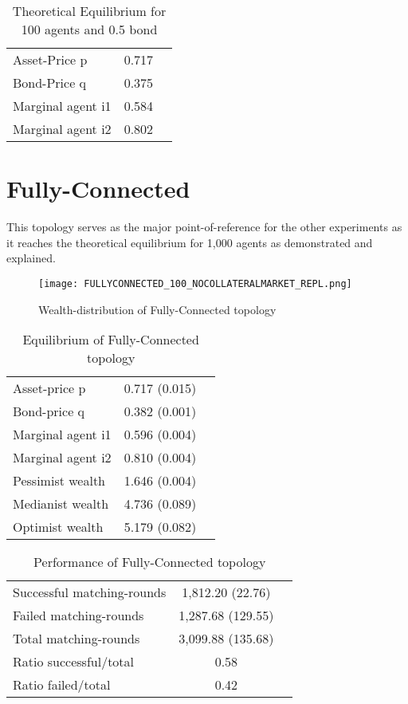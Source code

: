 \documentclass[Bachelorarbeit.tex]{subfiles}
\begin{document}
\begin{table}[H]
	\centering
	\caption{Theoretical Equilibrium for 100 agents and 0.5 bond}
	\begin{tabular} { l c r }
		\hline
		Asset-Price p & 0.717 \\
		Bond-Price q & 0.375 \\
		Marginal agent i1 & 0.584 \\
		Marginal agent i2 & 0.802 \\
		\hline
	\end{tabular}
	\label{tab:theoretical_equilibrium_100Agents_05Bond}
\end{table}

\section{Fully-Connected}
This topology serves as the major point-of-reference for the other experiments as it reaches the theoretical equilibrium for 1,000 agents as demonstrated and explained.

\begin{figure}[H]
	\centering
  \texttt{[image: FULLYCONNECTED\_100\_NOCOLLATERALMARKET\_REPL.png]}
	\caption{Wealth-distribution of Fully-Connected topology}
	\label{fig:wealth_FULLYCONNECTED_100_NOCOLLATERALMARKET_REPL}
\end{figure}

\begin{table}[H]
	\caption{Equilibrium of Fully-Connected topology}
	\centering
	\begin{tabular} { l c r }
		\hline
		Asset-price p & 0.717 (0.015) \\
		Bond-price q & 0.382 (0.001) \\
		Marginal agent i1 & 0.596 (0.004) \\
		Marginal agent i2 & 0.810 (0.004) \\
		\hline
		Pessimist wealth & 1.646 (0.004) \\
		Medianist wealth & 4.736 (0.089) \\
		Optimist wealth & 5.179 (0.082) \\
		\hline
	\end{tabular}
	\label{tab:fullyconnected_equilibrium_100Agents_05Bond}
\end{table} 

\begin{table}[H]
	\caption{Performance of Fully-Connected topology}
	\centering
	\begin{tabular} { l c r }
		\hline
		Successful matching-rounds & 1,812.20 (22.76) \\
		Failed matching-rounds & 1,287.68 (129.55) \\
		Total matching-rounds & 3,099.88 (135.68) \\
		\hline
		Ratio successful/total & 0.58 \\
		Ratio failed/total & 0.42 \\
		\hline
	\end{tabular}
\end{table}
\end{document}

